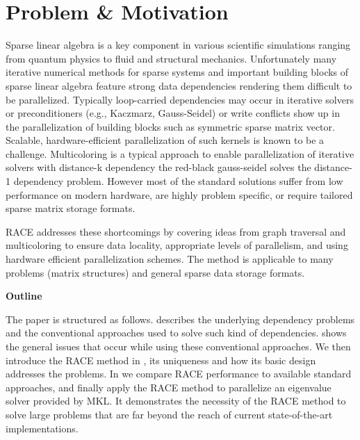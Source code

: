 	
\section{Problem \& Motivation}
	Sparse linear algebra is a key component in various scientific simulations
	ranging from quantum physics to fluid and structural mechanics.
	Unfortunately many iterative numerical methods for sparse systems 
	and important building 	blocks of sparse linear algebra feature strong 
	data dependencies rendering them difficult to be parallelized.
	Typically	loop-carried dependencies may occur in
	iterative solvers  or preconditioners (e.g., Kaczmarz, Gauss-Seidel) 
	or write conflicts show up in the parallelization of building blocks such 
	as symmetric sparse matrix vector.
	Scalable, hardware-efficient parallelization of such kernels is known to be a 
	challenge. Multicoloring is a typical approach to enable parallelization
	of iterative solvers with distance-k dependency \eg the 
	red-black gauss-seidel solves the distance-1 dependency problem.
	However most of the standard solutions suffer from low performance
	on modern hardware, are highly problem specific, or require tailored
    sparse matrix storage formats.

	\Acrshort{RACE} addresses these shortcomings by covering ideas from graph traversal
	and multicoloring to ensure data locality, appropriate levels of parallelism,
	and using hardware efficient parallelization schemes. The method is applicable
	to many problems (\ie matrix structures) and general sparse data storage formats.
	

\noindent\textbf{Outline}


\noindent	The paper is structured as follows.  describes
	the underlying dependency problems and the conventional
	approaches used to solve such kind of dependencies.  
	shows the general issues that occur while using these conventional
	approaches. We then introduce the \acrshort{RACE} method in ,
	its uniqueness	and how its	basic design addresses the problems. 
	In  we compare \acrshort{RACE} performance to
	available standard approaches, and finally apply the \acrshort{RACE}
	method to parallelize an eigenvalue solver provided by \acrshort{MKL}.
	It demonstrates the necessity of the \acrshort{RACE} method to solve 
	large problems that are far beyond the reach of current state-of-the-art
	implementations.
	
